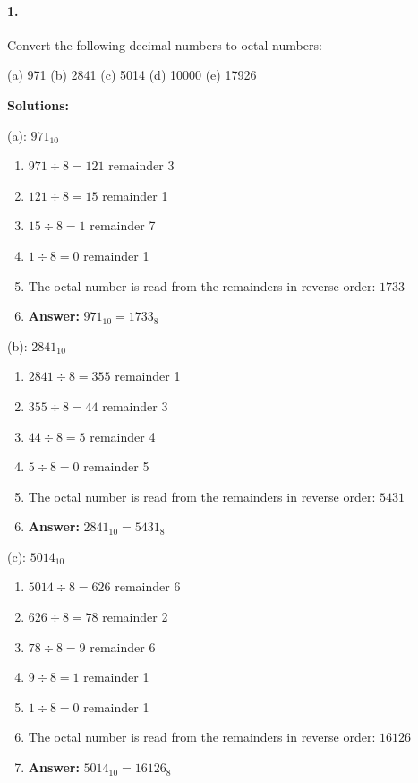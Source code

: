\documentclass{article}
\begin{document}
\paragraph*{1.}
Convert the following decimal numbers to octal numbers:

\vspace*{0.25cm}

(a) 971 (b) 2841 (c) 5014 (d) 10000 (e) 17926

\vspace*{0.5cm}

\noindent \textbf{Solutions:}

\vspace*{0.25cm}

\noindent (a): $971_{10}$

\begin{enumerate}
    \item $971 \div 8 = 121$ remainder 3
    \item $121 \div 8 = 15$ remainder 1
    \item $15 \div 8 = 1$ remainder 7
    \item $1 \div 8 = 0$ remainder 1
    \item The octal number is read from the remainders in reverse order: $1733$
    \item \textbf{Answer:} $971_{10} = 1733_8$
\end{enumerate}

\vspace*{0.5cm}

\noindent (b): $2841_{10}$

\begin{enumerate}
    \item $2841 \div 8 = 355$ remainder 1
    \item $355 \div 8 = 44$ remainder 3
    \item $44 \div 8 = 5$ remainder 4
    \item $5 \div 8 = 0$ remainder 5
    \item The octal number is read from the remainders in reverse order: $5431$
    \item \textbf{Answer:} $2841_{10} = 5431_8$
\end{enumerate}

\vspace*{0.5cm}

\noindent (c): $5014_{10}$

\begin{enumerate}
    \item $5014 \div 8 = 626$ remainder 6
    \item $626 \div 8 = 78$ remainder 2
    \item $78 \div 8 = 9$ remainder 6
    \item $9 \div 8 = 1$ remainder 1
    \item $1 \div 8 = 0$ remainder 1
    \item The octal number is read from the remainders in reverse order: $16126$
    \item \textbf{Answer:} $5014_{10} = 16126_8$
\end{enumerate}
\end{document}
